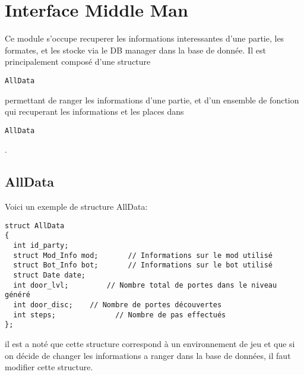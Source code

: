 \section{Interface Middle Man} 

Ce module s'occupe recuperer les informations interessantes d'une partie, les formates, et les stocke via le DB manager dans la base de donnée.
Il est principalement composé d'une structure \begin{verbatim}AllData\end{verbatim}permettant de ranger les informations d'une partie, et d'un ensemble de fonction
qui recuperant les informations et les places dans \begin{verbatim}AllData\end{verbatim}.

\subsection{AllData}

Voici un exemple de structure AllData:

\begin{verbatim}
struct AllData
{
  int id_party;
  struct Mod_Info mod;       // Informations sur le mod utilisé
  struct Bot_Info bot;       // Informations sur le bot utilisé
  struct Date date;
  int door_lvl;         // Nombre total de portes dans le niveau généré
  int door_disc;    // Nombre de portes découvertes
  int steps;              // Nombre de pas effectués
};
\end{verbatim}

il est a noté que cette structure correspond à un environnement de jeu et que si on décide de changer les informations a ranger dans la base de données, il faut modifier cette structure.
 
